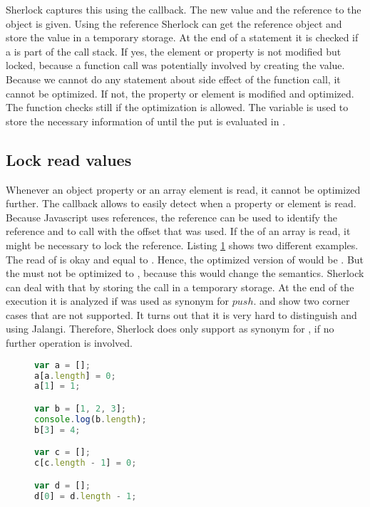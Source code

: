 Sherlock captures this using the  callback. The new value and the reference to the object is given. Using the reference Sherlock can get the reference object and store the value in a temporary storage. At the end of a statement it is checked if a  is part of the call stack. If yes, the element or property is not modified but locked, because a function call was potentially involved by creating the value. Because we cannot do any statement about side effect of the function call, it cannot be optimized. If not, the property or element is modified and optimized. The  function checks still if the optimization is allowed. The variable  is used to store the necessary information of  until the put is evaluated in .


\subsection{Lock read values}
Whenever an object property or an array element is read, it cannot be optimized further. The callback  allows to easily detect when a property or element is read. Because Javascript uses references, the reference can be used to identify the reference and to call  with the offset that was used. If the  of an array is read, it might be necessary to lock the reference. Listing \ref{fig:array_length} shows two different examples. The read of  is okay and equal to . Hence, the optimized version of  would be \js{[0, 1]}. But the  must not be optimized to \js{[1, 2, 3, 4]}, because this would change the semantics. Sherlock can deal with that by storing the  call in a temporary storage. At the end of the execution it is analyzed if  was used as synonym for $push$.  and  show two corner cases that are not supported. It turns out that it is very hard to distinguish  and  using Jalangi. Therefore, Sherlock does only support  as synonym for , if no further  operation is involved.

\begin{figure}[htbp]
\begin{lstlisting}[language=Javascript]
var a = [];
a[a.length] = 0;
a[1] = 1;

var b = [1, 2, 3];
console.log(b.length);
b[3] = 4;

var c = [];
c[c.length - 1] = 0;

var d = [];
d[0] = d.length - 1;
\end{lstlisting}
\caption{}\label{fig:array_length}
\end{figure}









